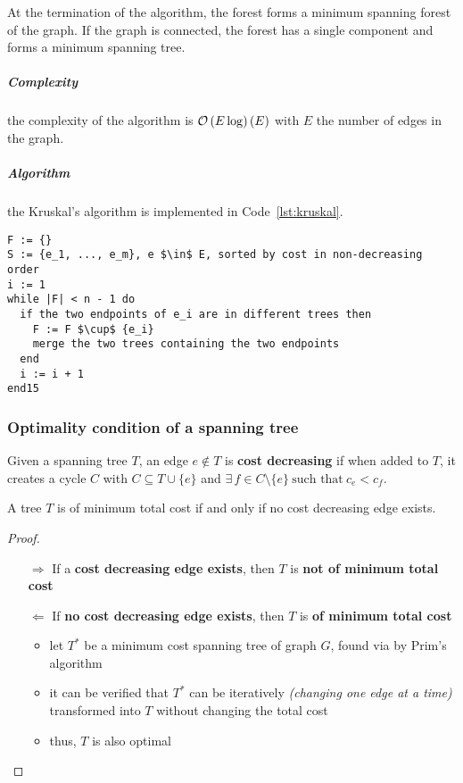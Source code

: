 \documentclass[english]{article}
\begin{document}
At the termination of the algorithm, the forest forms a minimum spanning forest of the graph.
If the graph is connected, the forest has a single component and forms a minimum spanning tree.

\subparagraph*{Complexity}
the complexity of the algorithm is \(\mathcal{O}\left(E \log\right)(E)\) with \(E\) the number of edges in the graph.

\subparagraph*{Algorithm}
the Kruskal's algorithm is implemented in Code~\ref{lst:kruskal}.

\begin{lstlisting}[caption={Kruskal's algorithm}, label={lst:kruskal}, float]
F := {}
S := {e_1, ..., e_m}, e $\in$ E, sorted by cost in non-decreasing order
i := 1
while |F| < n - 1 do
  if the two endpoints of e_i are in different trees then
    F := F $\cup$ {e_i}
    merge the two trees containing the two endpoints
  end
  i := i + 1
end15
\end{lstlisting}

\subsubsection{Optimality condition of a spanning tree}

Given a spanning tree \(T\), an edge \(e \notin T\) is \textbf{cost decreasing} if when added to \(T\), it creates a cycle \(C\) with \(C \subseteq T \cup \{e\}\) and \(\exists \, f \in C \setminus \{e\} \ \text{such that} \  c_e < c_f\).

\begin{theorem}
  A tree \(T\) is of minimum total cost if and only if no cost decreasing edge exists.
\end{theorem}

\begin{proof}
  \hfill
  \begin{itemize}
    \item[\(\Rightarrow\)] If a \textbf{cost decreasing edge exists}, then \(T\) is \textbf{not of minimum total cost}
    \item[\(\Leftarrow\)] If \textbf{no cost decreasing edge exists}, then \(T\) is \textbf{of minimum total cost}
      \begin{itemize}
        \item let \(T^\ast\) be a minimum cost spanning tree of graph \(G\), found via by Prim's algorithm
        \item it can be verified that \(T^\ast\) can be iteratively \textit{(changing one edge at a time)} transformed into \(T\) without changing the total cost
        \item thus, \(T\) is also optimal
      \end{itemize}
  \end{itemize}

\end{proof}
\end{document}
